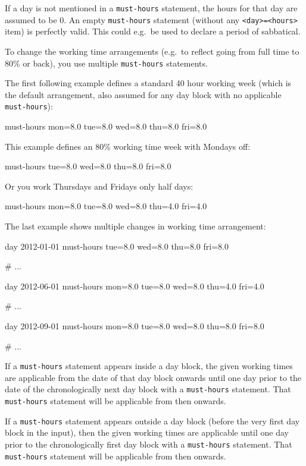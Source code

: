 \documentclass[11pt]{article}
\begin{document}
If a day is not mentioned in a \verb:must-hours: statement, the hours for that day are assumed to be 0. An empty \verb:must-hours: statement (without any \verb:<day>=<hours>: item) is perfectly valid. This could e.g.\ be used to declare a period of sabbatical.

To change the working time arrangements (e.g.\ to reflect going from full time to 80\% or back), you use multiple \verb:must-hours: statements.

The first following example defines a standard 40 hour working week (which is the default arrangement, also assumed for any day block with no applicable \verb:must-hours:):
\begin{inputfile}
must-hours mon=8.0 tue=8.0 wed=8.0 thu=8.0 fri=8.0
\end{inputfile}

This example defines an 80\% working time week with Mondays off:
\begin{inputfile}
must-hours tue=8.0 wed=8.0 thu=8.0 fri=8.0
\end{inputfile}

Or you work Thursdays and Fridays only half days:
\begin{inputfile}
must-hours mon=8.0 tue=8.0 wed=8.0 thu=4.0 fri=4.0
\end{inputfile}

The last example shows multiple changes in working time arrangement: 
\begin{inputfile}
day 2012-01-01
must-hours tue=8.0 wed=8.0 thu=8.0 fri=8.0

# ...

day 2012-06-01
must-hours mon=8.0 tue=8.0 wed=8.0 thu=4.0 fri=4.0

# ...

day 2012-09-01
must-hours mon=8.0 tue=8.0 wed=8.0 thu=8.0 fri=8.0

# ...
\end{inputfile}


If a \verb:must-hours: statement appears inside a day block, the given working times are applicable from the date of that day block onwards until one day prior to the date of the chronologically next day block with a \verb:must-hours: statement. That \verb:must-hours: statement will be applicable from then onwards.

If a \verb:must-hours: statement appears outside a day block (before the very first day block in the input), then the given working times are applicable until one day prior to the chronologically first day block with a \verb:must-hours: statement. That \verb:must-hours: statement will be applicable from then onwards.
\end{document}
